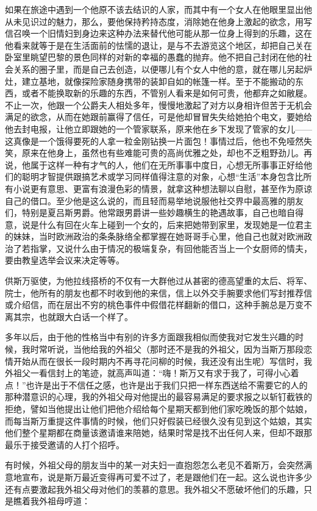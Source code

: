 \par 如果在旅途中遇到一个他原不该去结识的人家，而其中有一个女人在他眼里显出他从未见识过的魅力，那么，要他保持矜持态度，消除她在他身上激起的欲念，用写信召唤一个旧情妇到身边来这种办法来替代他可能从那一位身上得到的乐趣，这在他看来就等于是在生活面前的怯懦的退让，是与不去游览这个地区，却把自己关在卧室里眺望巴黎的景色同样的对新的幸福的愚蠢的抛弃。他不把自己封闭在他的社会关系的圈子里，而是自己去创造，以便哪儿有个女人中他的意，就在哪儿另起炉灶，建立基地，就像探险家随身携带的装卸自如的帐篷一样。至于不能搬动的东西，或者不能换取新的乐趣的东西，不管别人看来是如何可贵，他都弃之如敝屣。不止一次，他跟一个公爵夫人相处多年，慢慢地激起了对方以身相许但苦于无机会满足的欲念，从而在她跟前赢得了信任，可是他却冒冒失失给她拍个电文，要她给他去封电报，让他立即跟她的一个管家联系，原来他在乡下发现了管家的女儿——这真像是一个饿得要死的人拿一粒金刚钻换一片面包！事情过后，他也不免哑然失笑，原来在他身上，虽然也有些难能可贵的高尚优雅之处，却也不乏粗野劲儿。再说，他属于这样一种有才气的人，他们在无所事事中度日，心想无所事事正好给他们的聪明才智提供跟搞艺术或学习同样值得注意的对象，心想“生活”本身包含比所有小说更有意思、更富有浪漫色彩的情景，就拿这种想法聊以自慰，甚至作为原谅自己的借口。至少他是这么说的，而且轻而易举地说服他社交界中最高雅的朋友们，特别是夏吕斯男爵。他常跟男爵讲一些妙趣横生的艳遇故事，自己也暗自得意，说是什么有回在火车上碰到一个女的，后来把她带到家里，发现她是一位君主的妹妹，当时欧洲政治的条条脉络全都掌握在她哥哥手心里，他自己也就对欧洲政治了若指掌，又说什么由于情况的极端复杂，有回他能否当上一个女厨师的情夫，要由教皇选举会议来决定等等。
\par 供斯万驱使，为他拉线搭桥的不仅有一大群他过从甚密的德高望重的太后、将军、院士，他所有的朋友也都不时收到他的来信，信上以外交手腕要求他们写封推荐信或介绍信，而在层出不穷的桃色事件中假借花样翻新的借口，这种手腕总是万变不离其宗，也就跟大白话一个样了。
\par 多年以后，由于他的性格当中有别的许多方面跟我相似而使我对它发生兴趣的时候，我时常听说，当他给我的外祖父（那时还不是我的外祖父，因为当斯万那段恋情开始从而在很长一段时期内不再寻花问柳的时候，我还没有出生呢）写信时，我外祖父一看信封上的笔迹，就高声叫道：“嗨！斯万又有求于我了，可得小心着点！”也许是出于不信任之感，也许是出于我们只把一样东西送给不需要它的人的那种潜意识的心理，我的外祖父母对他提出的最容易满足的要求报之以斩钉截铁的拒绝，譬如当他提出让他们把他介绍给每个星期天都到他们家吃晚饭的那个姑娘，而每当斯万重提这件事情的时候，他们只好假装已经很久没有见到这个姑娘，其实他们整个星期都在商量该邀请谁来陪她，结果时常是找不出任何人来，但却不跟那最乐于接受邀请的人打个招呼。
\par 有时候，外祖父母的朋友当中的某一对夫妇一直抱怨怎么老见不着斯万，会突然满意地宣布，说是斯万最近变得再可爱不过了，老是跟他们在一起。这么说也许多少还有点要激起我外祖父母对他们的羡慕的意思。我外祖父不愿破坏他们的乐趣，只是瞧着我外祖母哼道：
